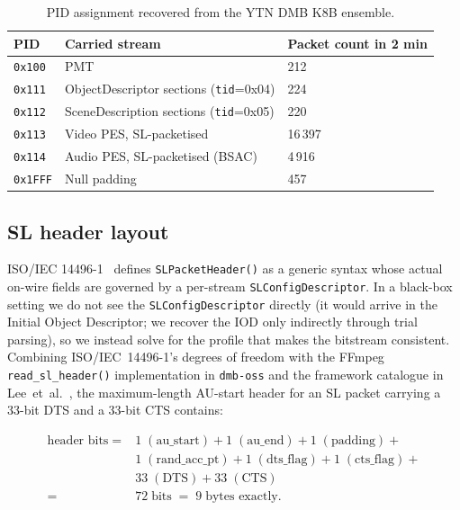 \documentclass[11pt,a4paper]{article}
\begin{document}
\begin{table}[t]
\centering
\caption{PID assignment recovered from the YTN DMB K8B ensemble.}
\label{tab:pids}
\begin{tabular}{lll}
\toprule
PID & Carried stream & Packet count in 2 min \\
\midrule
\texttt{0x100} & PMT                              & 212 \\
\texttt{0x111} & ObjectDescriptor sections (\texttt{tid}=0x04) & 224 \\
\texttt{0x112} & SceneDescription sections (\texttt{tid}=0x05) & 220 \\
\texttt{0x113} & Video PES, SL-packetised         & 16\,397 \\
\texttt{0x114} & Audio PES, SL-packetised (BSAC)  & 4\,916 \\
\texttt{0x1FFF} & Null padding                     & 457 \\
\bottomrule
\end{tabular}
\end{table}

\subsection{SL header layout}

ISO/IEC 14496-1~\cite{iso14496-1} defines \texttt{SLPacketHeader()}
as a generic syntax whose actual on-wire fields are governed by a
per-stream \texttt{SLConfigDescriptor}.  In a black-box setting we
do not see the \texttt{SLConfigDescriptor} directly (it would arrive
in the Initial Object Descriptor; we recover the IOD only
indirectly through trial parsing), so we instead solve for the
profile that makes the bitstream consistent.  Combining
ISO/IEC~14496-1's degrees of freedom with the FFmpeg
\texttt{read\_sl\_header()} implementation in \texttt{dmb-oss} and
the framework catalogue in
Lee~et~al.~\cite{lee2004m4smux}, the maximum-length AU-start
header for an SL packet carrying a 33-bit DTS and a 33-bit CTS
contains:

\begin{align*}
\text{header bits} \;=\; & 1 \;(\text{au\_start}) + 1 \;(\text{au\_end}) + 1 \;(\text{padding}) + \\
                         & 1 \;(\text{rand\_acc\_pt}) + 1 \;(\text{dts\_flag}) + 1 \;(\text{cts\_flag}) + \\
                         & 33 \;(\text{DTS}) + 33 \;(\text{CTS}) \\
                       =\; & 72 \; \text{bits} \;=\; 9 \; \text{bytes exactly}.
\end{align*}
\end{document}
